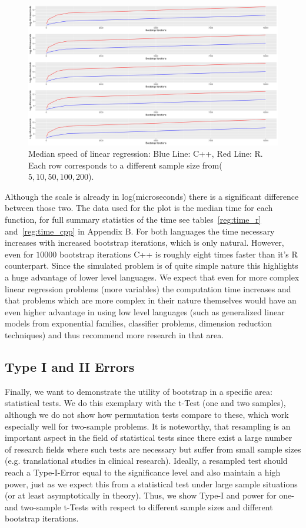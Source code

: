 \begin{figure}
\centering
	\includegraphics[scale=0.4]{./figures/plot_regression.pdf}
	\caption[Regression Complexity]{Median speed of linear regression: Blue Line: C++, Red Line: R. Each row corresponds to a different sample size from($5, 10, 50, 100, 200$).}
	\label{fig:regErr}
\end{figure}

Although the scale is already in log(microseconds) there is a significant difference between those two. The data used for the plot is the median time for each function, for full summary statistics of the time see tables~\ref{reg:time_r} and~\ref{reg:time_cpp} in Appendix B. For both languages the time necessary increases with increased bootstrap iterations, which is only natural. However, even for $10000$ bootstrap iterations C++ is roughly eight times faster than it's R counterpart. Since the simulated problem is of quite simple nature this highlights a huge advantage of lower level languages. We expect that even for more complex linear regression problems (more variables) the computation time increases and that problems which are more complex in their nature themselves would have an even higher advantage in using low level languages (such as generalized linear models from exponential families, classifier problems, dimension reduction techniques) and thus recommend more research in that area.

\subsection{Type I and II Errors}
Finally, we want to demonstrate the utility of bootstrap in a specific area: statistical tests. We do this exemplary with the t-Test (one and two samples), although we do not show how permutation tests compare to these, which work especially well for two-sample problems. It is noteworthy, that resampling is an important aspect in the field of statistical tests since there exist a large number of research fields where such tests are necessary but suffer from small sample sizes (e.g. translational studies in clinical research). Ideally, a resampled test should reach a Type-I-Error equal to the significance level and also maintain a high power, just as we expect this from a statistical test under large sample situations (or at least asymptotically in theory). Thus, we show Type-I and power for one- and two-sample t-Tests with respect to different sample sizes and different bootstrap iterations. 

